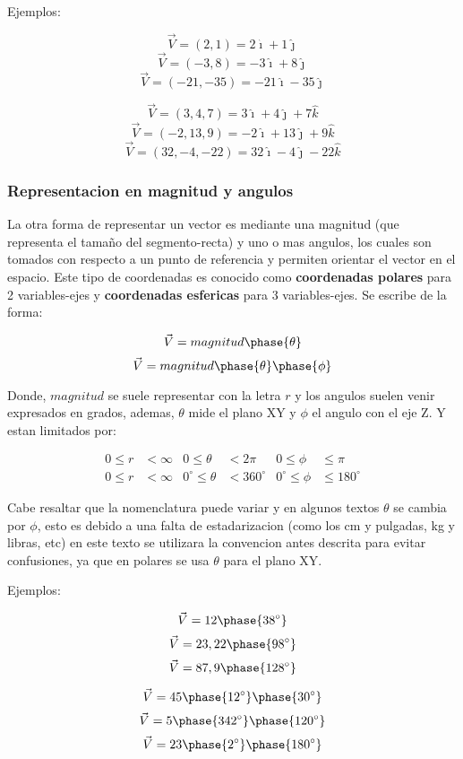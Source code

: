     Ejemplos:

    $$\vec{V}=(2,1)=2\hat{\imath}+1\hat{\jmath}$$
    $$\vec{V}=(-3,8)=-3\hat{\imath}+8\hat{\jmath}$$
    $$\vec{V}=(-21,-35)=-21\hat{\imath}-35\hat{\jmath}$$

    $$\vec{V}=(3,4,7)=3\hat{\imath}+4\hat{\jmath}+7\hat{k}$$
    $$\vec{V}=(-2,13,9)=-2\hat{\imath}+13\hat{\jmath}+9\hat{k}$$
    $$\vec{V}=(32,-4,-22)=32\hat{\imath}-4\hat{\jmath}-22\hat{k}$$


    \subsubsection{Representacion en magnitud y angulos}

    La otra forma de representar un vector es mediante una magnitud (que
    representa el tamaño del segmento-recta) y uno o mas angulos, los cuales
    son tomados con respecto a un punto de referencia y permiten orientar el
    vector en el espacio. Este tipo de coordenadas es conocido como
    \textbf{coordenadas polares} para 2 variables-ejes y \textbf{coordenadas
    esfericas} para 3 variables-ejes. Se escribe de la forma:

    $$\vec{V}= magnitud \phase{\theta} $$
    $$\vec{V}= magnitud  \phase{\theta}\phase{\phi} $$

    Donde, $magnitud$ se suele representar con la letra $r$ y los angulos
    suelen venir expresados en grados, ademas, $\theta$ mide el plano XY y
    $\phi$ el angulo con el eje Z. Y estan limitados por:


     \begin{align*}
         0\leq r&<\infty & 0\leq\theta&<2\pi & 0\leq\phi&\leq\pi \\
         0\leq r&<\infty & 0^\circ\leq\theta&<360^\circ & 0^\circ\leq\phi&\leq180^\circ
    \end{align*}

    Cabe resaltar que la nomenclatura puede variar y en algunos textos $\theta$
    se cambia por $\phi$, esto es debido a una falta de estadarizacion (como los
    cm y pulgadas, kg y libras, etc) en este texto se utilizara la convencion
    antes descrita para evitar confusiones, ya que en polares se usa $\theta$ para
    el plano XY.

    Ejemplos:


    $$\vec{V}=12 \phase{38^\circ} $$
    $$\vec{V}=23,22 \phase{98^\circ} $$
    $$\vec{V}=87,9 \phase{128^\circ} $$

    $$\vec{V}=45 \phase{12^\circ}\phase{30^\circ} $$
    $$\vec{V}=5 \phase{342^\circ}\phase{120^\circ} $$
    $$\vec{V}=23 \phase{2^\circ}\phase{180^\circ} $$

